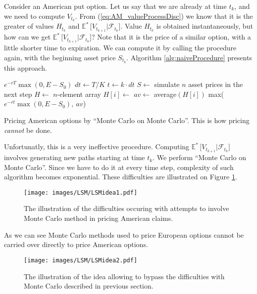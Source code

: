 \documentclass[a4paper,12pt, oneside]{book}
\theoremstyle{definition}
\theoremstyle{remark}
\def\Em{{\mathbb{E}^*}\,}
\begin{document}
Consider an American put option. Let us say that we are already at time $t_k$, and we need to compute $V_{t_k}$. From (\ref{eq:AM_valueProcessDisc}) we know that it is the greater of values $H_{t_k}$ and $\Em\bigl[ V_{t_{k+1}} | \mathcal{F}_{t_k} \bigr]$. Value $H_{t_k}$ is obtained instantaneously, but how can we get $\Em\bigl[ V_{t_{k+1}} | \mathcal{F}_{t_k} \bigr]$? Note that it is the price of a similar option, with a little shorter time to expiration. We can compute it by calling the procedure again, with the beginning asset price $S_{t_k}$. Algorithm \ref{alg:naiveProcedure} presents this approach.

\begin{algorithm}
 \begin{algorithmic}[1]
      \State \Return $e^{-rT} \max(0, E - S_0)$
    \EndIf
    \State $dt \gets T/K$
    \State $t \gets k\cdot dt$
    \State $S \gets$ simulate $n$ asset prices in the next step 
    \State $H \gets$ $n$-element array
       \State $H[i] \gets$ 
    \EndFor 
    \State $av \gets$ average$(H[i])$
    \State \Return max($e^{-rt} \max(0, E - S_0),\ av$)
  \EndFunction 
 \end{algorithmic}
 \caption{Pricing American options by ``Monte Carlo on Monte Carlo''. This is how pricing \emph{cannot} be done.}
 \label{alg:naiveProcedure}
\end{algorithm}

Unfortunatly, this is a very ineffective procedure. Computing $\Em\bigl[ V_{t_{k+1}} | \mathcal{F}_{t_k} \bigr]$ involves generating new paths starting at time $t_k$. We perform ``Monte Carlo on Monte Carlo''. Since we have to do it at every time step, complexity of such algorithm becomes exponential. These difficulties are illustrated on Figure \ref{fig:MC_difficulties}.

\begin{figure}[!ht]
\centering
 \texttt{[image: images/LSM/LSMidea1.pdf]}
\caption{The illustration of the difficulties occuring with attempts to involve Monte Carlo method in pricing American claims. }
\end{figure}

As we can see Monte Carlo methods used to price European options cannot be carried over directly to price American options.

\begin{figure}[!ht]
\centering
 \texttt{[image: images/LSM/LSMidea2.pdf]}
\caption{The illustration of the idea allowing to bypass the difficulties with Monte Carlo described in previous section.}
\label{fig:MC_difficulties}
\end{figure}
\end{document}
